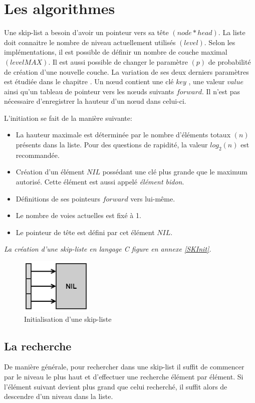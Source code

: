 \documentclass[hidelinks,a4paper, 12pt]{article}
\begin{document}
	\newpage
	\section{Les algorithmes}
	Une skip-list a besoin d'avoir un pointeur vers sa tête $(node* head)$. La liste doit connaitre le nombre de niveau actuellement utilisés $(level)$. Selon les implémentations, il est possible de définir un nombre de couche maximal $(levelMAX)$. Il est aussi possible de changer le paramètre $(p)$ de probabilité de création d'une nouvelle couche. La variation de ses deux derniers paramètres est étudiée dans le chapitre .
	Un nœud contient une clé $key$ , une valeur $value$ ainsi qu'un tableau de pointeur vers les nœuds suivants $forward$. Il n'est pas nécessaire d'enregistrer la hauteur d'un nœud dans celui-ci.
	
	
	L'initiation se fait de la manière suivante:
	\begin{itemize}
		\item La hauteur maximale est déterminée par le nombre d'éléments totaux $(n)$ présents dans la liste. Pour des questions de rapidité, la valeur $log_2(n)$ est recommandée.
		\item Création d'un élément $NIL$ possédant une clé plus grande que le maximum autorisé. Cette élément est aussi appelé \textit{élément bidon}.
		\item Définitions de ses pointeurs $forward$ vers lui-même.
		\item Le nombre de voies actuelles est fixé à 1.
		\item Le pointeur de tête est défini par cet élément $NIL$.
	\end{itemize}
	\emph{La création d'une skip-liste en langage C figure en annexe \ref{SKInit}.}
	
	\begin{figure}[h]
		\includegraphics{img/init}
		\caption{Initialisation d'une skip-liste}
		\label{SkipInit}
	\end{figure}
	
	\newpage
	\subsection{La recherche}
	De manière générale, pour rechercher dans une skip-list il suffit de commencer par le niveau le plus haut et d'effectuer une recherche élément par élément. Si l'élément suivant devient plus grand que celui recherché, il suffit alors de descendre d'un niveau dans la liste.
	
\end{document}
